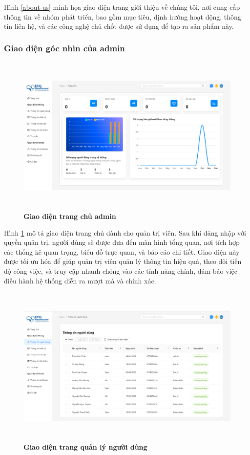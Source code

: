Hình \ref{about-us} minh họa giao diện trang giới thiệu về chúng tôi, nơi cung cấp thông tin về nhóm phát triển, bao gồm mục tiêu,
định hướng hoạt động, thông tin liên hệ, và các công nghệ chủ chốt được sử dụng để tạo ra sản phẩm này.

\subsubsection{Giao diện góc nhìn của admin}
\begin{figure}[H]
	\centering
	\includegraphics[width=15cm,height=8cm]{Images/admin_ui/home.png}
	\caption[Giao diện trang chủ admin]{\bfseries \fontsize{12pt}{0pt}\selectfont Giao diện trang chủ admin}
	\label{home-admin}
\end{figure}

Hình \ref{home-admin} mô tả giao diện trang chủ dành cho quản trị viên. Sau khi đăng nhập với quyền quản trị, người dùng sẽ được đưa đến màn hình tổng quan,
nơi tích hợp các thống kê quan trọng, biểu đồ trực quan, và báo cáo chi tiết. Giao diện này được tối ưu hóa để giúp quản trị viên quản lý thông tin hiệu quả,
theo dõi tiến độ công việc, và truy cập nhanh chóng vào các tính năng chính, đảm bảo việc điều hành hệ thống diễn ra mượt mà và chính xác.

\begin{figure}[H]
	\centering
	\includegraphics[width=15cm,height=8cm]{Images/admin_ui/users.png}
	\caption[Giao diện trang quản lý người dùng]{\bfseries \fontsize{12pt}{0pt}\selectfont Giao diện trang quản lý người dùng}
	\label{users-admin}
\end{figure}

